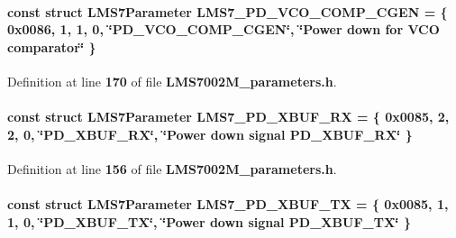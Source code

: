 \paragraph[{L\+M\+S7\+\_\+\+P\+D\+\_\+\+V\+C\+O\+\_\+\+C\+O\+M\+P\+\_\+\+C\+G\+EN}]{\setlength{\rightskip}{0pt plus 5cm}const struct {\bf L\+M\+S7\+Parameter} L\+M\+S7\+\_\+\+P\+D\+\_\+\+V\+C\+O\+\_\+\+C\+O\+M\+P\+\_\+\+C\+G\+EN = \{ 0x0086, 1, 1, 0, \char`\"{}\+P\+D\+\_\+\+V\+C\+O\+\_\+\+C\+O\+M\+P\+\_\+\+C\+G\+E\+N\char`\"{}, \char`\"{}\+Power down for V\+C\+O comparator\char`\"{} \}\hspace{0.3cm}{\ttfamily [static]}}\label{LMS7002M__parameters_8h_a172d799d700dd713d0094c2d51206d76}


Definition at line {\bf 170} of file {\bf L\+M\+S7002\+M\+\_\+parameters.\+h}.

\paragraph[{L\+M\+S7\+\_\+\+P\+D\+\_\+\+X\+B\+U\+F\+\_\+\+RX}]{\setlength{\rightskip}{0pt plus 5cm}const struct {\bf L\+M\+S7\+Parameter} L\+M\+S7\+\_\+\+P\+D\+\_\+\+X\+B\+U\+F\+\_\+\+RX = \{ 0x0085, 2, 2, 0, \char`\"{}\+P\+D\+\_\+\+X\+B\+U\+F\+\_\+\+R\+X\char`\"{}, \char`\"{}\+Power down signal P\+D\+\_\+\+X\+B\+U\+F\+\_\+\+R\+X\char`\"{} \}\hspace{0.3cm}{\ttfamily [static]}}\label{LMS7002M__parameters_8h_a02aa3ccd5bcd846b87ed1af463170716}


Definition at line {\bf 156} of file {\bf L\+M\+S7002\+M\+\_\+parameters.\+h}.

\paragraph[{L\+M\+S7\+\_\+\+P\+D\+\_\+\+X\+B\+U\+F\+\_\+\+TX}]{\setlength{\rightskip}{0pt plus 5cm}const struct {\bf L\+M\+S7\+Parameter} L\+M\+S7\+\_\+\+P\+D\+\_\+\+X\+B\+U\+F\+\_\+\+TX = \{ 0x0085, 1, 1, 0, \char`\"{}\+P\+D\+\_\+\+X\+B\+U\+F\+\_\+\+T\+X\char`\"{}, \char`\"{}\+Power down signal P\+D\+\_\+\+X\+B\+U\+F\+\_\+\+T\+X\char`\"{} \}\hspace{0.3cm}{\ttfamily [static]}}\label{LMS7002M__parameters_8h_ac332b9d93b3c9d61a61c90b8e004dce0}


